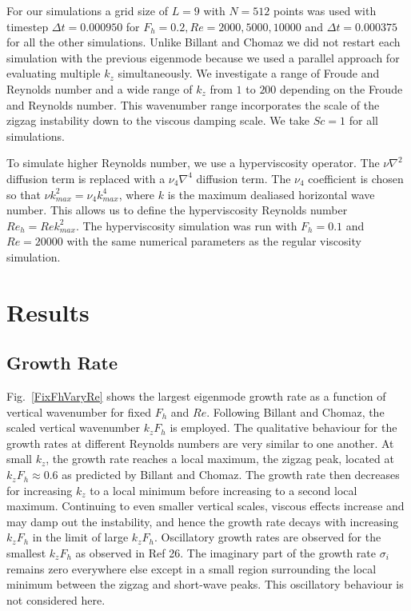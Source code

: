 For our simulations a grid size of $L=9$ with $N=512$ points was used with timestep $\Delta t=0.000950$ for $F_{h}=0.2,Re=2000,5000,10000$ and $\Delta t=0.000375$ for all the other simulations. Unlike Billant and Chomaz\cite{bc2000c} we did not restart each simulation with the previous eigenmode because we used a parallel approach for evaluating multiple $k_{z}$ simultaneously. We investigate a range of Froude and Reynolds number and a wide range of $k_{z}$ from $1$ to $200$ depending on the Froude and Reynolds number. This wavenumber range incorporates the scale of the zigzag instability down to the viscous damping scale. We take $Sc=1$ for all simulations.  

To simulate higher Reynolds number, we use a hyperviscosity operator. The $\nu\nabla^{2}$ diffusion term is replaced with a $\nu_{4}\nabla^{4}$ diffusion term. The $\nu_{4}$ coefficient is chosen so that $\nu k_{max}^{2} = \nu_{4}k_{max}^{4}$, where $k$ is the maximum dealiased horizontal wave number. This allows us to define the hyperviscosity Reynolds number $Re_{h}=Re k_{max}^{2}$. The hyperviscosity simulation was run with $F_{h}=0.1$ and $Re=20000$ with the same numerical parameters as the regular viscosity simulation.

\section{Results}

\subsection{Growth Rate}
Fig.~\ref{FixFhVaryRe} shows the largest eigenmode growth rate as a function of vertical wavenumber for fixed $F_{h}$ and $Re$. Following Billant and Chomaz\cite{bc2000c}, the scaled vertical wavenumber $k_{z}F_{h}$ is employed. The qualitative behaviour for the growth rates at different Reynolds numbers are very similar to one another. At small $k_{z}$, the growth rate reaches a local maximum, the zigzag peak, located at $k_{z}F_{h}\approx 0.6$ as predicted by Billant and Chomaz\cite{bc2000c}.  The growth rate then decreases for increasing $k_{z}$ to a local minimum before increasing to a second local maximum. Continuing to even smaller vertical scales, viscous effects increase and may damp out the instability, and hence the growth rate decays with increasing $k_{z}F_{h}$ in the limit of large $k_{z}F_{h}$. Oscillatory growth rates are observed for the smallest $k_{z}F_{h}$ as observed in Ref 26\nocite{bc1999}. The imaginary part of the growth rate $\sigma_{i}$ remains zero everywhere else except in a small region surrounding the local minimum between the zigzag and short-wave peaks. This oscillatory behaviour is not considered here. 

